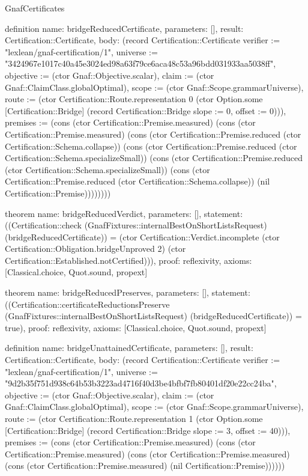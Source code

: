 \begin{lexlean}{GnafCertificates}
\begin{semanticmodule}
definition{
  name: bridgeReducedCertificate,
  parameters: [],
  result: Certification::Certificate,
  body: (record Certification::Certificate {verifier := "lexlean/gnaf-certification/1", universe := "3424967e1017c40a45e3024ed98a63f79ce6aca48c53a96bdd031933aa5038ff", objective := (ctor Gnaf::Objective.scalar), claim := (ctor Gnaf::ClaimClass.globalOptimal), scope := (ctor Gnaf::Scope.grammarUniverse), route := (ctor Certification::Route.representation 0 (ctor Option.some [Certification::Bridge] (record Certification::Bridge {slope := 0, offset := 0}))), premises := (cons (ctor Certification::Premise.measured) (cons (ctor Certification::Premise.measured) (cons (ctor Certification::Premise.reduced (ctor Certification::Schema.collapse)) (cons (ctor Certification::Premise.reduced (ctor Certification::Schema.specializeSmall)) (cons (ctor Certification::Premise.reduced (ctor Certification::Schema.specializeSmall)) (cons (ctor Certification::Premise.reduced (ctor Certification::Schema.collapse)) (nil Certification::Premise)))))))})
}

theorem{
  name: bridgeReducedVerdict,
  parameters: [],
  statement: ((Certification::check (GnafFixtures::internalBestOnShortListsRequest) (bridgeReducedCertificate)) = (ctor Certification::Verdict.incomplete (ctor Certification::Obligation.bridgeUnproved 2) (ctor Certification::Established.notCertified))),
  proof: reflexivity{},
  axioms: [Classical.choice, Quot.sound, propext]
}

theorem{
  name: bridgeReducedPreserves,
  parameters: [],
  statement: ((Certification::certificateReductionsPreserve (GnafFixtures::internalBestOnShortListsRequest) (bridgeReducedCertificate)) = true),
  proof: reflexivity{},
  axioms: [Classical.choice, Quot.sound, propext]
}

definition{
  name: bridgeUnattainedCertificate,
  parameters: [],
  result: Certification::Certificate,
  body: (record Certification::Certificate {verifier := "lexlean/gnaf-certification/1", universe := "9d2b35f751d938c64b53b3223ad4716f40d3be4bfbf7fb80401df20e22cc24ba", objective := (ctor Gnaf::Objective.scalar), claim := (ctor Gnaf::ClaimClass.globalOptimal), scope := (ctor Gnaf::Scope.grammarUniverse), route := (ctor Certification::Route.representation 1 (ctor Option.some [Certification::Bridge] (record Certification::Bridge {slope := 3, offset := 40}))), premises := (cons (ctor Certification::Premise.measured) (cons (ctor Certification::Premise.measured) (cons (ctor Certification::Premise.measured) (cons (ctor Certification::Premise.measured) (nil Certification::Premise)))))})
}


\end{semanticmodule}
\end{lexlean}
